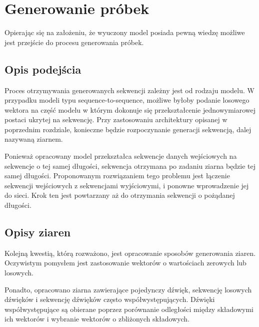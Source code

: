 \chapter{Generowanie próbek} 
{
    Opierając się na założeniu, że wyuczony model posiada pewną wiedzę możliwe jest przejście
    do procesu generowania próbek.

    \section{Opis podejścia}
    {
        Proces otrzymywania generowanych sekwencji zależny jest od rodzaju modelu.
        W przypadku modeli typu sequence-to-sequence, możliwe byłoby podanie losowego 
        wektora na część modelu w którym dokonuje się przekształcenie jednowymiarowej postaci ukrytej na sekwencję.
        Przy zastosowaniu architektury opisanej w poprzednim rozdziale, konieczne będzie 
        rozpoczynanie generacji sekwencją, dalej nazywaną ziarnem. 

        Ponieważ opracowany model przekształca sekwencje danych wejściowych na sekwencje
        o tej samej długości, sekwencja otrzymana po zadaniu ziarna będzie tej samej długości.
        Proponowanym rozwiązaniem tego problemu jest łączenie sekwencji wejściowych z sekwencjami wyjściowymi,
        i ponowne wprowadzenie jej do sieci. Krok ten jest powtarzany aż do otrzymania sekwencji o pożądanej długości.
    }

    \newpage

    \section{Opisy ziaren}
    {
        Kolejną kwestią, którą rozważono, jest opracowanie sposobów generowania ziaren.
        Oczywistym pomysłem jest zastosowanie wektorów o wartościach zerowych lub losowych.

        Ponadto, opracowano ziarna zawierające pojedynczy dźwięk, sekwencję losowych dźwięków
        i sekwencję dźwięków często współwystępujących. Dźwięki współwystępujące są obierane poprzez
        porównanie odległości między składowymi ich wektorów i wybranie wektorów o zbliżonych składowych.
    }
}